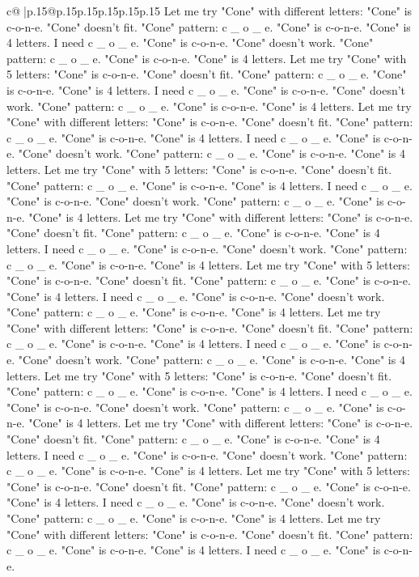 \documentclass{article}
\begin{document}
{\begin{supertabular}{c@{$\;$}|p{.15\linewidth}@{}p{.15\linewidth}p{.15\linewidth}p{.15\linewidth}p{.15\linewidth}p{.15\linewidth}}
{{{Let me try "Cone" with different letters: "Cone" is c{-}o{-}n{-}e. "Cone" doesn't fit. "Cone" pattern: c \_ o \_ e. "Cone" is c{-}o{-}n{-}e. "Cone" is 4 letters. I need c \_ o \_ e. "Cone" is c{-}o{-}n{-}e. "Cone" doesn't work. "Cone" pattern: c \_ o \_ e. "Cone" is c{-}o{-}n{-}e. "Cone" is 4 letters. Let me try "Cone" with 5 letters: "Cone" is c{-}o{-}n{-}e. "Cone" doesn't fit. "Cone" pattern: c \_ o \_ e. "Cone" is c{-}o{-}n{-}e. "Cone" is 4 letters. I need c \_ o \_ e. "Cone" is c{-}o{-}n{-}e. "Cone" doesn't work. "Cone" pattern: c \_ o \_ e. "Cone" is c{-}o{-}n{-}e. "Cone" is 4 letters. Let me try "Cone" with different letters: "Cone" is c{-}o{-}n{-}e. "Cone" doesn't fit. "Cone" pattern: c \_ o \_ e. "Cone" is c{-}o{-}n{-}e. "Cone" is 4 letters. I need c \_ o \_ e. "Cone" is c{-}o{-}n{-}e. "Cone" doesn't work. "Cone" pattern: c \_ o \_ e. "Cone" is c{-}o{-}n{-}e. "Cone" is 4 letters. Let me try "Cone" with 5 letters: "Cone" is c{-}o{-}n{-}e. "Cone" doesn't fit. "Cone" pattern: c \_ o \_ e. "Cone" is c{-}o{-}n{-}e. "Cone" is 4 letters. I need c \_ o \_ e. "Cone" is c{-}o{-}n{-}e. "Cone" doesn't work. "Cone" pattern: c \_ o \_ e. "Cone" is c{-}o{-}n{-}e. "Cone" is 4 letters. Let me try "Cone" with different letters: "Cone" is c{-}o{-}n{-}e. "Cone" doesn't fit. "Cone" pattern: c \_ o \_ e. "Cone" is c{-}o{-}n{-}e. "Cone" is 4 letters. I need c \_ o \_ e. "Cone" is c{-}o{-}n{-}e. "Cone" doesn't work. "Cone" pattern: c \_ o \_ e. "Cone" is c{-}o{-}n{-}e. "Cone" is 4 letters. Let me try "Cone" with 5 letters: "Cone" is c{-}o{-}n{-}e. "Cone" doesn't fit. "Cone" pattern: c \_ o \_ e. "Cone" is c{-}o{-}n{-}e. "Cone" is 4 letters. I need c \_ o \_ e. "Cone" is c{-}o{-}n{-}e. "Cone" doesn't work. "Cone" pattern: c \_ o \_ e. "Cone" is c{-}o{-}n{-}e. "Cone" is 4 letters. Let me try "Cone" with different letters: "Cone" is c{-}o{-}n{-}e. "Cone" doesn't fit. "Cone" pattern: c \_ o \_ e. "Cone" is c{-}o{-}n{-}e. "Cone" is 4 letters. I need c \_ o \_ e. "Cone" is c{-}o{-}n{-}e. "Cone" doesn't work. "Cone" pattern: c \_ o \_ e. "Cone" is c{-}o{-}n{-}e. "Cone" is 4 letters. Let me try "Cone" with 5 letters: "Cone" is c{-}o{-}n{-}e. "Cone" doesn't fit. "Cone" pattern: c \_ o \_ e. "Cone" is c{-}o{-}n{-}e. "Cone" is 4 letters. I need c \_ o \_ e. "Cone" is c{-}o{-}n{-}e. "Cone" doesn't work. "Cone" pattern: c \_ o \_ e. "Cone" is c{-}o{-}n{-}e. "Cone" is 4 letters. Let me try "Cone" with different letters: "Cone" is c{-}o{-}n{-}e. "Cone" doesn't fit. "Cone" pattern: c \_ o \_ e. "Cone" is c{-}o{-}n{-}e. "Cone" is 4 letters. I need c \_ o \_ e. "Cone" is c{-}o{-}n{-}e. "Cone" doesn't work. "Cone" pattern: c \_ o \_ e. "Cone" is c{-}o{-}n{-}e. "Cone" is 4 letters. Let me try "Cone" with 5 letters: "Cone" is c{-}o{-}n{-}e. "Cone" doesn't fit. "Cone" pattern: c \_ o \_ e. "Cone" is c{-}o{-}n{-}e. "Cone" is 4 letters. I need c \_ o \_ e. "Cone" is c{-}o{-}n{-}e. "Cone" doesn't work. "Cone" pattern: c \_ o \_ e. "Cone" is c{-}o{-}n{-}e. "Cone" is 4 letters. Let me try "Cone" with different letters: "Cone" is c{-}o{-}n{-}e. "Cone" doesn't fit. "Cone" pattern: c \_ o \_ e. "Cone" is c{-}o{-}n{-}e. "Cone" is 4 letters. I need c \_ o \_ e. "Cone" is c{-}o{-}n{-}e. }}}
\end{supertabular}}
\end{document}
